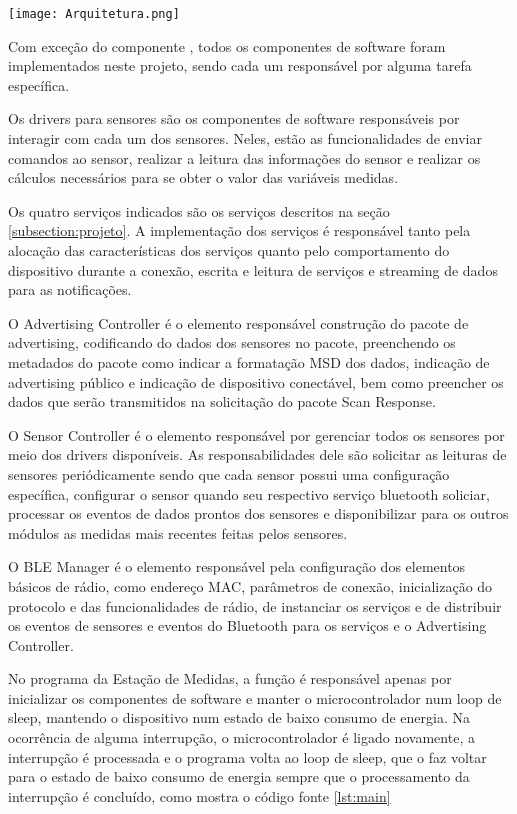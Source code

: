 \begin{center}
	\centering 
	\texttt{[image: Arquitetura.png]}
	\label{fig:architecture}
\end{center} 

Com exceção do componente , todos os componentes de
software foram implementados neste projeto, sendo cada um responsável por alguma
tarefa específica.

Os drivers para sensores são os componentes de software responsáveis por
interagir com cada um dos sensores. Neles, estão as funcionalidades de enviar
comandos ao sensor, realizar a leitura das informações do sensor e realizar os
cálculos necessários para se obter o valor das variáveis medidas.

Os quatro serviços indicados são os serviços descritos na seção
\ref{subsection:projeto}. A implementação dos serviços é responsável tanto pela
alocação das características dos serviços quanto pelo comportamento do
dispositivo durante a conexão, escrita e leitura de serviços e streaming de
dados para as notificações.

O Advertising Controller é o elemento responsável construção do pacote de
advertising, codificando do dados dos sensores no pacote, preenchendo os
metadados do pacote como indicar a formatação MSD dos dados, indicação de
advertising público e indicação de dispositivo conectável, bem como preencher os
dados que serão transmitidos na solicitação do pacote Scan Response.

O Sensor Controller é o elemento responsável por gerenciar todos os sensores por
meio dos drivers disponíveis. As responsabilidades dele são solicitar as
leituras de sensores periódicamente sendo que cada sensor possui uma
configuração específica, configurar o sensor quando seu respectivo serviço
bluetooth soliciar, processar os eventos de dados prontos dos sensores e
disponibilizar para os outros módulos as medidas mais recentes feitas
pelos sensores.

O BLE Manager é o elemento responsável pela configuração dos elementos básicos
de rádio, como endereço MAC, parâmetros de conexão, inicialização do protocolo e
das funcionalidades de rádio, de instanciar os serviços e de distribuir os
eventos de sensores e eventos do Bluetooth para os serviços e o Advertising
Controller.

No programa da Estação de Medidas, a função  é responsável apenas
por inicializar os componentes de software e manter o microcontrolador num loop
de sleep, mantendo o dispositivo num estado de baixo consumo de energia. Na
ocorrência de alguma interrupção, o microcontrolador é ligado novamente, a
interrupção é processada e o programa volta ao loop de sleep, que o faz voltar
para o estado de baixo consumo de energia sempre que o processamento da
interrupção é concluído, como mostra o código fonte \ref{lst:main}

